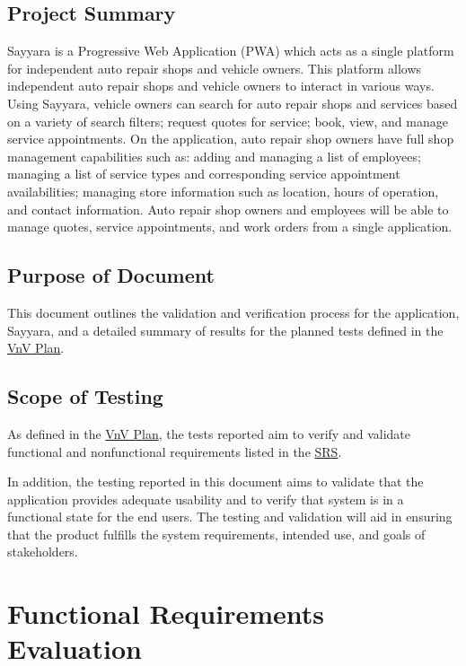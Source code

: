 \documentclass[12pt, titlepage]{article}
\begin{document}
\subsection{Project Summary}

Sayyara is a Progressive Web Application (PWA) which acts as a single platform for independent auto
repair shops and vehicle owners. This platform allows independent auto repair shops and vehicle
owners to interact in various ways. Using Sayyara, vehicle owners can search for auto repair shops
and services based on a variety of search filters; request quotes for service; book, view, and
manage service appointments. On the application, auto repair shop owners have full shop management
capabilities such as: adding and managing a list of employees; managing a list of service types and
corresponding service appointment availabilities; managing store information such as location,
hours of operation, and contact information. Auto repair shop owners and employees will be able to
manage quotes, service appointments, and work orders from a single application.

\subsection{Purpose of Document}
This document outlines the validation and verification process for the application, Sayyara, and a
detailed summary of results for the planned tests defined in the
\href{https://github.com/arkinmodi/project-sayyara/blob/main/docs/VnVPlan/VnVPlan.pdf}{VnV Plan}.

\subsection{Scope of Testing}
As defined in the
\href{https://github.com/arkinmodi/project-sayyara/blob/main/docs/VnVPlan/VnVPlan.pdf}{VnV Plan},
the tests reported aim to verify and validate functional and nonfunctional requirements listed in
the \href{https://github.com/arkinmodi/project-sayyara/blob/main/docs/SRS/SRS.pdf}{SRS}.

In addition, the testing reported in this document aims to validate that the application provides
adequate usability and to verify that system is in a functional state for the end users. The
testing and validation will aid in ensuring that the product fulfills the system requirements,
intended use, and goals of stakeholders.

\section{Functional Requirements Evaluation}
\end{document}
